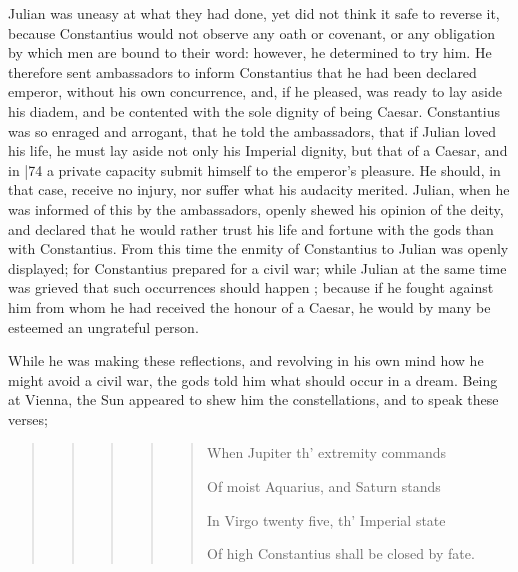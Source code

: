 Julian was uneasy at what they had done, yet did not think it safe to reverse it, because Constantius would not observe any oath or covenant, or any obligation by which men are bound to their word: however, he determined to try him. He therefore sent ambassadors to inform Constantius that he had been declared emperor, without his own concurrence, and, if he pleased, was ready to lay aside his diadem, and be contented with the sole dignity of being Caesar. Constantius was so enraged and arrogant, that he told the ambassadors, that if Julian loved his life, he must lay aside not only his Imperial dignity, but that of a Caesar, and in
|74 a private capacity submit himself to the emperor's pleasure. He should, in that case, receive no injury, nor suffer what his audacity merited. Julian, when he was informed of this by the ambassadors, openly shewed his opinion of the deity, and declared that he would rather trust his life and fortune with the gods than with Constantius. From this time the enmity of Constantius to Julian was openly displayed; for Constantius prepared for a civil war; while Julian at the same time was grieved that such occurrences should happen ; because if he fought against him from whom he had received the honour of a Caesar, he would by many be esteemed an ungrateful person.

While he was making these reflections, and revolving in his own mind how he might avoid a civil war, the gods told him what should occur in a dream. Being at Vienna, the Sun appeared to shew him the constellations, and to speak these verses;

\begin{quote}

\begin{quote}

\begin{quote}

\begin{quote}

\begin{quote}

When Jupiter th' extremity commands 

Of moist Aquarius, and Saturn stands 

In Virgo twenty five, th' Imperial state 

Of high Constantius shall be closed by fate.

\end{quote}

\end{quote}

\end{quote}

\end{quote}

\end{quote}


